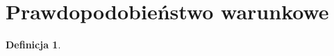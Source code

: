\documentclass[11pt, leqno]{scrartcl}
\theoremstyle{definition}
\newtheorem{definition}{Definicja}[section]
\begin{document}
    \section{Prawdopodobieństwo warunkowe}
    \begin{definition}
        
    \end{definition}
\end{document}
